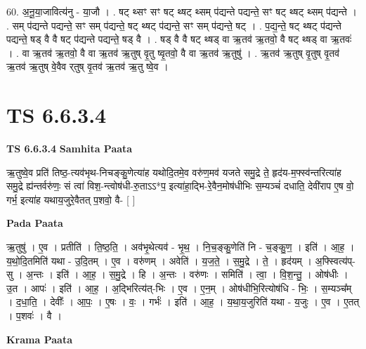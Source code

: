 \documentclass[17pt]{extarticle}
\begin{document}
60. अ॒नू॒या॒जावित्य॑नु - या॒जौ । . षट् थ्सꣳ सꣳ षट् थ्षट् थ्सम् प॑द्यन्ते पद्यन्ते॒ सꣳ षट् थ्षट् थ्सम् प॑द्यन्ते । . सम् प॑द्यन्ते पद्यन्ते॒ सꣳ सम् प॑द्यन्ते॒ षट् थ्षट् प॑द्यन्ते॒ सꣳ सम् प॑द्यन्ते॒ षट् । . प॒द्य॒न्ते॒ षट् थ्षट् प॑द्यन्ते पद्यन्ते॒ षड् वै वै षट् प॑द्यन्ते पद्यन्ते॒ षड् वै । . षड् वै वै षट् थ्षड् वा ऋ॒तव॑ ऋ॒तवो॒ वै षट् थ्षड् वा ऋ॒तवः॑ । . वा ऋ॒तव॑ ऋ॒तवो॒ वै वा ऋ॒तव॑ ऋ॒तुष् वृ॒तु ष्वृ॒तवो॒ वै वा ऋ॒तव॑ ऋ॒तुषु॑ । . ऋ॒तव॑ ऋ॒तुष् वृ॒तुष् वृ॒तव॑ ऋ॒तव॑ ऋ॒तुष् वे॒वैव र्‌तुष् वृ॒तव॑ ऋ॒तव॑ ऋ॒तु ष्वे॒व । \newline
\pagebreak
{}

\section{ TS 6.6.3.4 }

\textbf{TS 6.6.3.4 } \newline
\textbf{Samhita Paata} \newline

ऋ॒तुष्वे॒व प्रति॑ तिष्ठ॒-त्यव॑भृथ-निचङ्कु॒णेत्या॑ह यथोदि॒तमे॒व वरु॑ण॒मव॑ यजते समु॒द्रे ते॒ हृद॑य-म॒फ्स्व॑न्तरित्या॑ह समु॒द्रे ह्य॑न्तर्वरु॑णः॒ सं त्वा॑ विश॒-न्त्वोष॑धी-रु॒ताऽऽ*प॒ इत्या॑हा॒द्भि-रे॒वैन॒मोष॑धीभिः स॒म्यञ्चं॑ दधाति॒ देवी॑राप ए॒ष वो॒ गर्भ॒ इत्या॑ह यथाय॒जुरे॒वैतत् प॒शवो॒ वै- [  ] \newline

\textbf{Pada Paata} \newline

ऋ॒तुषु॑ । ए॒व । प्रतीति॑ । ति॒ष्ठ॒ति॒ । अव॑भृ॒थेत्यव॑ - भृ॒थ॒ । नि॒च॒ङ्कु॒णेति॑ नि - च॒ङ्कु॒ण॒ । इति॑ । आ॒ह॒ । य॒थो॒दि॒तमिति॑ यथा - उ॒दि॒तम् । ए॒व । वरु॑णम् । अवेति॑ । य॒ज॒ते॒ । स॒मु॒द्रे । ते॒ । हृद॑यम् । अ॒फ्स्वित्य॑प्-सु । अ॒न्तः । इति॑ । आ॒ह॒ । स॒मु॒द्रे । हि । अ॒न्तः । वरु॑णः । समिति॑ । त्वा॒ । वि॒श॒न्तु॒ । ओष॑धीः । उ॒त । आपः॑ । इति॑ । आ॒ह॒ । अ॒द्भिरित्य॑त्-भिः । ए॒व । ए॒न॒म् । ओष॑धीभि॒रित्योष॑धि - भिः॒ । स॒म्यञ्च᳚म् । द॒धा॒ति॒ । देवीः᳚ । आ॒पः॒ । ए॒षः । वः॒ । गर्भः॑ । इति॑ । आ॒ह॒ । य॒था॒य॒जुरिति॑ यथा - य॒जुः । ए॒व । ए॒तत् । प॒शवः॑ । वै ।  \newline


\textbf{Krama Paata} \newline
\end{document}

